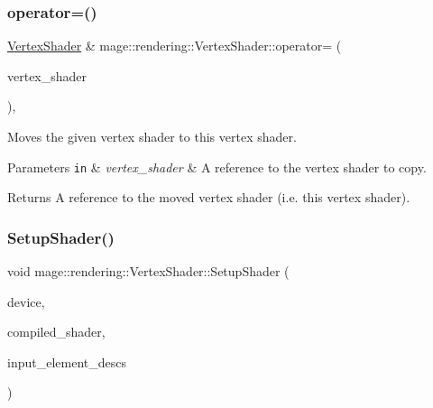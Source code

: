 \subsubsection{\texorpdfstring{operator=()}{operator=()}\hspace{0.1cm}{\footnotesize\ttfamily [2/2]}}
{\footnotesize\ttfamily \hyperlink{classmage_1_1rendering_1_1_vertex_shader}{Vertex\+Shader} \& mage\+::rendering\+::\+Vertex\+Shader\+::operator= (\begin{DoxyParamCaption}\item[{\hyperlink{classmage_1_1rendering_1_1_vertex_shader}{Vertex\+Shader} \&\&}]{vertex\+\_\+shader }\end{DoxyParamCaption})\hspace{0.3cm}{\ttfamily [default]}, {\ttfamily [noexcept]}}

Moves the given vertex shader to this vertex shader.


\begin{DoxyParams}[1]{Parameters}
\mbox{\tt in}  & {\em vertex\+\_\+shader} & A reference to the vertex shader to copy. \\
\hline
\end{DoxyParams}
\begin{DoxyReturn}{Returns}
A reference to the moved vertex shader (i.\+e. this vertex shader). 
\end{DoxyReturn}
\hypertarget{classmage_1_1rendering_1_1_vertex_shader_a09e717d181f09bd4e50a758bd804705b}{}\label{classmage_1_1rendering_1_1_vertex_shader_a09e717d181f09bd4e50a758bd804705b} 
\subsubsection{\texorpdfstring{Setup\+Shader()}{SetupShader()}}
{\footnotesize\ttfamily void mage\+::rendering\+::\+Vertex\+Shader\+::\+Setup\+Shader (\begin{DoxyParamCaption}\item[{I\+D3\+D11\+Device \&}]{device,  }\item[{const \hyperlink{classmage_1_1rendering_1_1_compiled_shader}{Compiled\+Shader} \&}]{compiled\+\_\+shader,  }\item[{gsl\+::span$<$ const D3\+D11\+\_\+\+I\+N\+P\+U\+T\+\_\+\+E\+L\+E\+M\+E\+N\+T\+\_\+\+D\+E\+SC $>$}]{input\+\_\+element\+\_\+descs }\end{DoxyParamCaption})\hspace{0.3cm}{\ttfamily [private]}}

